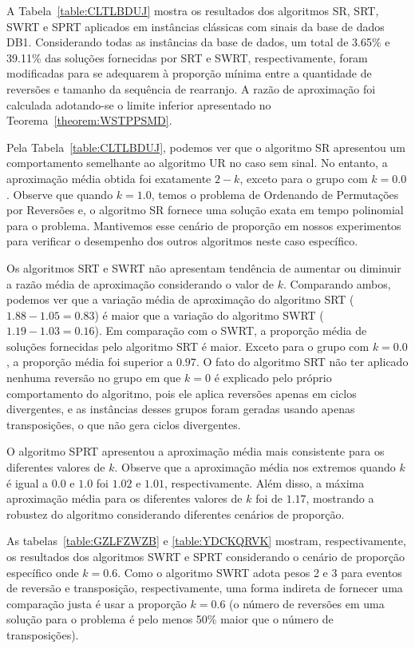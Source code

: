 A Tabela~\ref{table:CLTLBDUJ} mostra os resultados dos algoritmos SR, SRT, SWRT e SPRT aplicados em instâncias clássicas com sinais da base de dados DB1. Considerando todas as instâncias da base de dados, um total de 3.65\% e 39.11\% das soluções fornecidas por SRT e SWRT, respectivamente, foram modificadas para se adequarem à proporção mínima entre a quantidade de reversões e tamanho da sequência de rearranjo. A razão de aproximação foi calculada adotando-se o limite inferior apresentado no Teorema~\ref{theorem:WSTPPSMD}.



Pela Tabela~\ref{table:CLTLBDUJ}, podemos ver que o algoritmo SR apresentou um comportamento semelhante ao algoritmo UR no caso sem sinal. No entanto, a aproximação média obtida foi exatamente $2 - k$, exceto para o grupo com $k = 0.0$. Observe que quando $k=1.0$, temos o problema de Ordenando de Permutações por Reversões e, o algoritmo SR fornece uma solução exata em tempo polinomial para o problema. Mantivemos esse cenário de proporção em nossos experimentos para verificar o desempenho dos outros algoritmos neste caso específico.

Os algoritmos SRT e SWRT não apresentam tendência de aumentar ou diminuir a razão média de aproximação considerando o valor de $k$. Comparando ambos, podemos ver que a variação média de aproximação do algoritmo SRT ($1.88 - 1.05 = 0.83$) é maior que a variação do algoritmo SWRT ($1.19 - 1.03 = 0.16$). Em comparação com o SWRT, a proporção média de soluções fornecidas pelo algoritmo SRT é maior. Exceto para o grupo com $k = 0.0$, a proporção média foi superior a $0.97$. O fato do algoritmo SRT não ter aplicado nenhuma reversão no grupo em que $k = 0$ é explicado pelo próprio comportamento do algoritmo, pois ele aplica reversões apenas em ciclos divergentes, e as instâncias desses grupos foram geradas usando apenas transposições, o que não gera ciclos divergentes.

O algoritmo SPRT apresentou a aproximação média mais consistente para os diferentes valores de $k$. Observe que a aproximação média nos extremos quando $k$ é igual a $0.0$ e $1.0$ foi $1.02$ e $1.01$, respectivamente. Além disso, a máxima aproximação média para os diferentes valores de $k$ foi de $1.17$, mostrando a robustez do algoritmo considerando diferentes cenários de proporção.

As tabelas~\ref{table:GZLFZWZB} e \ref{table:YDCKQRVK} mostram, respectivamente, os resultados dos algoritmos SWRT e SPRT considerando o cenário de proporção específico onde $k=0.6$. Como o algoritmo SWRT adota pesos 2 e 3 para eventos de reversão e transposição, respectivamente, uma forma indireta de fornecer uma comparação justa é usar a proporção $k=0.6$ (o número de reversões em uma solução para o problema \SbPRT{} é pelo menos 50\% maior que o número de transposições).

